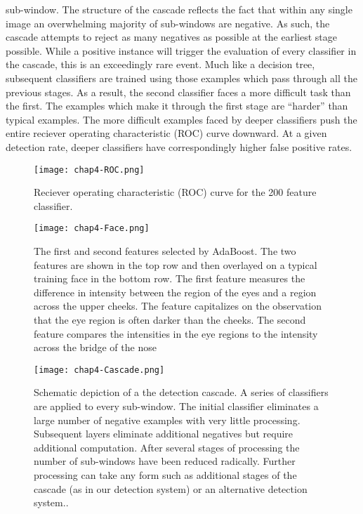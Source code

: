 \begin{compactitem}
sub-window.
The structure of the cascade reflects the fact that within any single image an overwhelming
majority of sub-windows are negative. As such, the cascade attempts to
reject as many negatives as possible at the earliest stage possible. While a positive
instance will trigger the evaluation of every classifier in the cascade, this is an exceedingly
rare event.
Much like a decision tree, subsequent classifiers are trained using those examples
which pass through all the previous stages. As a result, the second classifier faces a
more difficult task than the first. The examples which make it through the first stage are
“harder” than typical examples. The more difficult examples faced by deeper classifiers
push the entire reciever operating characteristic (ROC) curve downward. At a given
detection rate, deeper classifiers have correspondingly higher false positive rates.

\begin{figure}[h]
  \centering
	\texttt{[image: chap4-ROC.png]}
  \caption{Reciever operating characteristic (ROC) curve for the 200 feature classifier.}
  \label{fig:chap4-ROC}
\end{figure}

\begin{figure}[h]
  \centering
	\texttt{[image: chap4-Face.png]}
  \caption{The first and second features selected by AdaBoost. The two features are
shown in the top row and then overlayed on a typical training face in the bottom row.
The first feature measures the difference in intensity between the region of the eyes and
a region across the upper cheeks. The feature capitalizes on the observation that the
eye region is often darker than the cheeks. The second feature compares the intensities
in the eye regions to the intensity across the bridge of the nose}
  \label{fig:chap4-Face}
\end{figure}


\begin{figure}[h]
  \centering
	\texttt{[image: chap4-Cascade.png]}
  \caption{Schematic depiction of a the detection cascade. A series of classifiers are applied
to every sub-window. The initial classifier eliminates a large number of negative
examples with very little processing. Subsequent layers eliminate additional negatives
but require additional computation. After several stages of processing the number of
sub-windows have been reduced radically. Further processing can take any form such
as additional stages of the cascade (as in our detection system) or an alternative detection
system..}
  \label{fig:chap4-Cascade}
\end{figure}

\end{compactitem}

